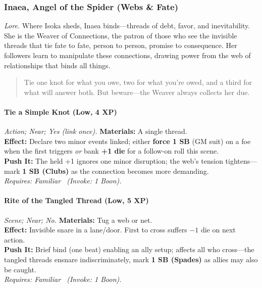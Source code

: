\subsubsection{Inaea, Angel of the Spider (Webs \& Fate)}
\textit{Lore.} Where Isoka sheds, Inaea binds—threads of debt, favor, and inevitability. She is the Weaver of Connections, the patron of those who see the invisible threads that tie fate to fate, person to person, promise to consequence. Her followers learn to manipulate these connections, drawing power from the web of relationships that binds all things.

\begin{quote}
Tie one knot for what you owe, two for what you're owed, and a third for what will answer both. But beware—the Weaver always collects her due.
\end{quote}

\paragraph{Tie a Simple Knot (Low, 4 XP)} \emph{Action; Near; Yes (link once).}
\textbf{Materials:} A single thread.\\
\textbf{Effect:} Declare two minor events linked; either \textbf{force 1 SB} (GM suit) on a foe when the first triggers \emph{or} bank \textbf{+1 die} for a follow-on roll this scene.\\
\textbf{Push It:} The held +1 ignores one minor disruption; the web's tension tightens—mark \textbf{1 SB (Clubs)} as the connection becomes more demanding.\\
\emph{Requires: Familiar \ (\textit{Invoke:} 1 Boon).}

\paragraph{Rite of the Tangled Thread (Low, 5 XP)} \emph{Scene; Near; No.}
\textbf{Materials:} Tug a web or net.\\
\textbf{Effect:} Invisible snare in a lane/door. First to cross suffers \(-1\) die on next action.\\
\textbf{Push It:} Brief bind (one beat) enabling an ally setup; affects all who cross—the tangled threads ensnare indiscriminately, mark \textbf{1 SB (Spades)} as allies may also be caught.\\
\emph{Requires: Familiar \ (\textit{Invoke:} 1 Boon).}

